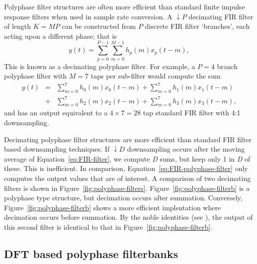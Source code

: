 \documentclass{ws-rv961x669}
\begin{document}
Polyphase filter structures are often more efficient than standard
finite impulse response filters when used in sample rate conversion.
A $\downarrow P$ decimating FIR filter of length $K=MP$ can be constructed
from $P$ discrete FIR filter `branches', each acting upon a different
phase; that is
\begin{equation}
y(t)=\sum_{p=0}^{P-1}\sum_{m=0}^{M-1}h_{p}(m)x_{p}(t-m),\label{eq:FIR-polyphase-filter}
\end{equation}
This is known as a decimating polyphase filter. For example, a $P=\mbox{4}$
branch polyphase filter with $M=\mbox{7}$ taps per sub-filter would
compute the sum
\begin{eqnarray}
y(t) & = & \sum_{m=0}^{7}h_{0}(m)x_{0}(t-m)+\sum_{m=0}^{7}h_{1}(m)x_{1}(t-m)\nonumber \\
 & + & \sum_{m=0}^{7}h_{2}(m)x_{2}(t-m)+\sum_{m=0}^{7}h_{3}(m)x_{3}(t-m),
\end{eqnarray}
and has an output equivalent to a $\mbox{4}\times\mbox{7}=\mbox{28}$
tap standard FIR filter with 4:1 downsampling. 

Decimating polyphase filter structures are more efficient than standard
FIR filter based downsampling techniques. If $\downarrow D$ downsampling
occurs after the moving average of Equation~\ref{eq:FIR-filter},
we compute \emph{D} sums, but keep only 1 in \emph{D} of these. This
is inefficient. In comparison, Equation~\ref{eq:FIR-polyphase-filter}
only computes the output values that are of interest. A comparison
of two decimating filters is shown in Figure~\ref{fig:polyphase-filters}.
Figure~\ref{fig:polyphase-filterb} is a polyphase type structure,
but decimation occurs after summation. Conversely, Figure~\ref{fig:polyphase-filterb}
shows a more efficient implentation where decimation occurs before
summation. By the noble identities (see \citep{Vaidyanathan:1990p6127}),
the output of this second filter is identical to that in Figure~\ref{fig:polyphase-filterb}.


\subsection{DFT based polyphase filterbanks}
\end{document}
